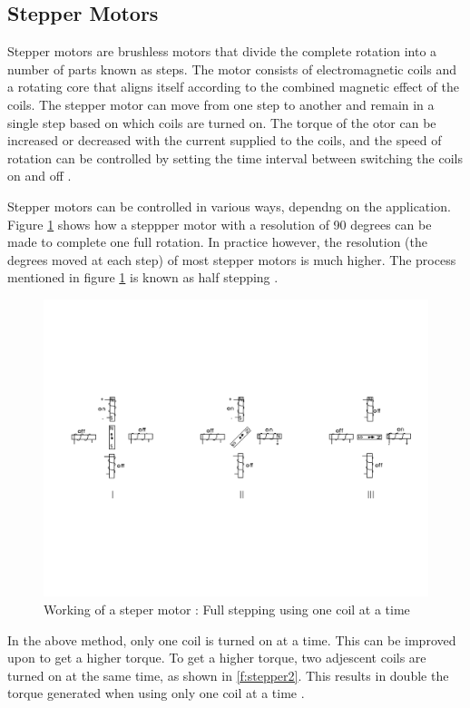 \documentclass[sigconf]{acmart}
\begin{document}
\subsection{Stepper Motors}
Stepper motors are brushless motors that divide the complete rotation into a number of parts known as steps. The motor consists of electromagnetic coils and a rotating core that aligns itself according to the combined magnetic effect of the coils. The stepper motor can move from one step to another and remain in a single step based on which coils are turned on. The torque of the otor can be increased or decreased with the current supplied to the coils, and the speed of rotation can be controlled by setting the time interval between switching the coils on and off \cite{wiki-stepper}.

Stepper motors can be controlled in various ways, dependng on the application. 
Figure \ref{f:stepper1} shows how a steppper motor with a resolution of 90 degrees can be made to complete one full rotation. In practice however, the resolution (the degrees moved at each step) of most stepper motors is much higher. The process mentioned in figure \ref{f:stepper1} is known as half stepping \cite{stepper1}.

\begin{figure}[!ht]
  \centering\includegraphics[width=\columnwidth]{images/stepper1.pdf}
  \caption{Working of a steper motor : Full stepping using one coil at a time \cite{stepper1}}\label{f:stepper1}
\end{figure}

In the above method, only one coil is turned on at a time. This can be improved upon to get a higher torque. To get a higher torque, two adjescent coils are turned on at the same time, as shown in \ref{f:stepper2}. This results in double the torque generated when using only one coil at a time \cite{stepper2}.
\end{document}
